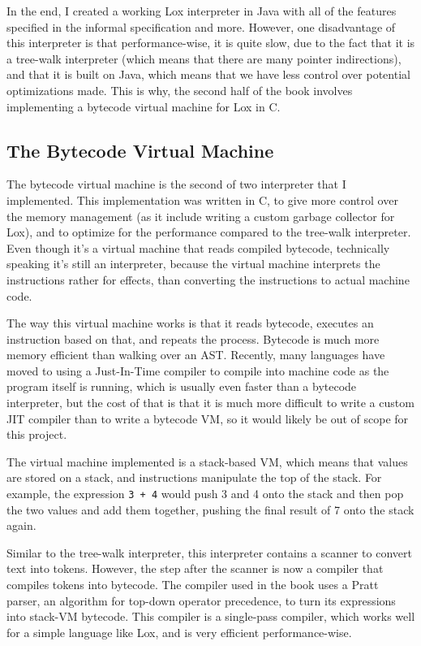 \documentclass[tikz]{article}
\renewcommand{\:}{\colon}
\begin{document}
In the end, I created a working Lox interpreter in Java with all of the features specified in the informal specification and more. However, one disadvantage of this interpreter is that performance-wise, it is quite slow, due to the fact that it is a tree-walk interpreter (which means that there are many pointer indirections), and that it is built on Java, which means that we have less control over potential optimizations made. This is why, the second half of the book involves implementing a bytecode virtual machine for Lox in C.

\subsection*{The Bytecode Virtual Machine}
The bytecode virtual machine is the second of two interpreter that I implemented. This implementation was written in C, to give more control over the memory management (as it include writing a custom garbage collector for Lox), and to optimize for the performance compared to the tree-walk interpreter. Even though it's a virtual machine that reads compiled bytecode, technically speaking it's still an interpreter, because the virtual machine interprets the instructions rather for effects, than converting the instructions to actual machine code.

The way this virtual machine works is that it reads bytecode, executes an instruction based on that, and repeats the process. Bytecode is much more memory efficient than walking over an AST. Recently, many languages have moved to using a Just-In-Time compiler to compile into machine code as the program itself is running, which is usually even faster than a bytecode interpreter, but the cost of that is that it is much more difficult to write a custom JIT compiler than to write a bytecode VM, so it would likely be out of scope for this project.

The virtual machine implemented is a stack-based VM, which means that values are stored on a stack, and instructions manipulate the top of the stack. For example, the expression \texttt{3 + 4} would push 3 and 4 onto the stack and then pop the two values and add them together, pushing the final result of 7 onto the stack again.

Similar to the tree-walk interpreter, this interpreter contains a scanner to convert text into tokens. However, the step after the scanner is now a compiler that compiles tokens into bytecode. The compiler used in the book uses a Pratt parser, an algorithm for top-down operator precedence, to turn its expressions into stack-VM bytecode. This compiler is a single-pass compiler, which works well for a simple language like Lox, and is very efficient performance-wise.
\end{document}
